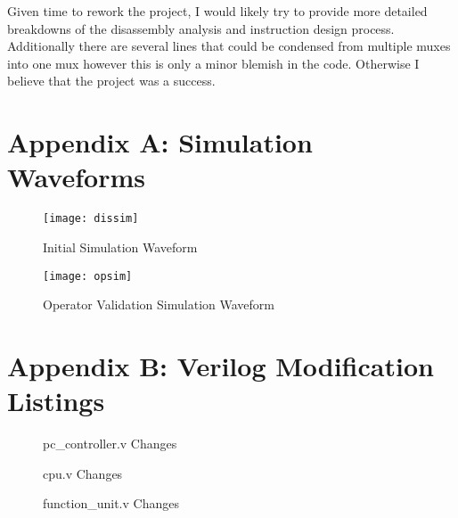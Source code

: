 \documentclass[12pt,letterpaper,titlepage]{article}
\begin{document}
\begin{raggedright}
Given time to rework the project, I would likely try to provide more detailed breakdowns of the disassembly analysis and instruction design process. Additionally there are several lines that could be condensed from multiple muxes into one mux however this is only a minor blemish in the code. Otherwise I believe that the project was a success.

\clearpage

\section{Appendix A: Simulation Waveforms}\label{simwave}

\begin{figure}[ht]
\centering
\texttt{[image: dissim]}
\caption{Initial Simulation Waveform}\label{dissim}
\end{figure}

\begin{figure}[ht]
\centering
\texttt{[image: opsim]}
\caption{Operator Validation Simulation Waveform}\label{opsim}
\end{figure}

\clearpage


\section{Appendix B: Verilog Modification Listings}\label{srcdiff}

\begin{figure}[ht]
\centering

\caption{pc\_controller.v Changes}\label{pc}
\end{figure}

\clearpage

\begin{figure}[ht]
\centering

\caption{cpu.v Changes}\label{cpu}
\end{figure}

\clearpage

\begin{figure}[ht]
\centering

\caption{function\_unit.v Changes}\label{fn}
\end{figure}

\clearpage




\end{raggedright}
\end{document}

